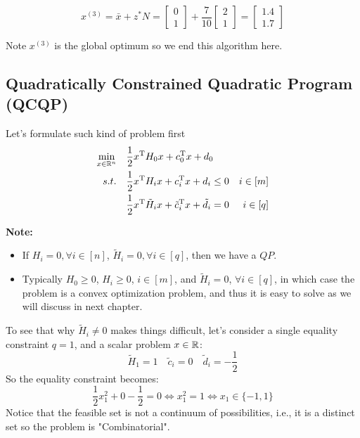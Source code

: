 \begin{equation*}
x^{(3)}= \bar{x}+ z^*N = 
\begin{bmatrix}
0\\
1
\end{bmatrix}
+ 
\frac{7}{10}
\begin{bmatrix}
2\\
1
\end{bmatrix} = 
\begin{bmatrix}
1.4\\
1.7
\end{bmatrix}
\end{equation*}

Note $x^{(3)}$ is the global optimum so we end this algorithm here.



\vspace{0.5cm}
\subsection{Quadratically Constrained Quadratic Program (QCQP)}
Let's formulate such kind of problem first
\begin{align*}
\min_{x\in \mathbb{R}^n} \quad &\frac{1}{2}x^{{\rm T}}H_0 x + c_0^{{\rm T}} x + d_0\\
s.t.\quad &\frac{1}{2}x^{{\rm T}}H_ix + c^{{\rm T}}_i x + d_i \leq 0  & i\in [m]\\
&\frac{1}{2} x^{{\rm T}} \tilde{H}_ix + \tilde{c}_i^{{\rm T}}x + \tilde{d}_i = 0 & i\in [q]
\end{align*}

\textbf{Note:}

\begin{itemize}
	\item If $H_i = 0, \forall i\in [n]$, $\tilde{H}_i = 0, \forall i\in [q]$, then we have a $QP$.
	
	\item Typically $H_0\geq 0$, $H_i\geq 0$, $i\in [m]$, and $\tilde{H}_i = 0$, $\forall i\in [q]$, in which case the problem is a convex optimization problem, and thus it is easy to solve as we will discuss in next chapter.
	
\end{itemize}

To see that why $\tilde{H}_i \neq 0$ makes things difficult, let's consider a single  equality constraint $q = 1$, and a scalar problem $x\in \mathbb{R}$:
$$\tilde{H}_1 = 1 \quad \tilde{c}_i = 0 \quad \tilde{d}_i = -\frac{1}{2}$$
So the equality constraint becomes:
$$\frac{1}{2}x_1^2 + 0 - \frac{1}{2} = 0 \Leftrightarrow x_1^2 = 1 \Leftrightarrow x_1\in\{-1, 1\} $$
Notice that the feasible set is not a continuum of possibilities, i.e., it is a distinct set so the problem is "Combinatorial".





